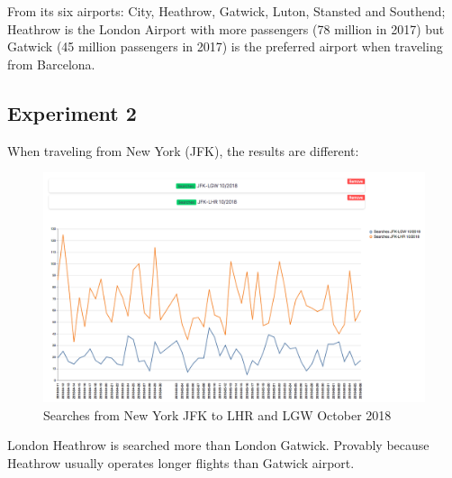 From its six airports: City, Heathrow, Gatwick, Luton, Stansted and Southend; Heathrow is the London Airport with more passengers (78 million in 2017\cite{london_traffic}) but Gatwick (45 million passengers in 2017) is the preferred airport when traveling from Barcelona.

\subsection*{Experiment 2} \label{exp2}

When traveling from New York (JFK), the results are different:

\begin{figure}[H]
\centering
\includegraphics[scale=0.35]{resources/experiment02.png}
\caption{Searches from New York JFK to LHR and LGW October 2018}
\end{figure}

London Heathrow is searched more than London Gatwick. Provably because Heathrow usually operates longer flights than Gatwick airport.
\\\\
